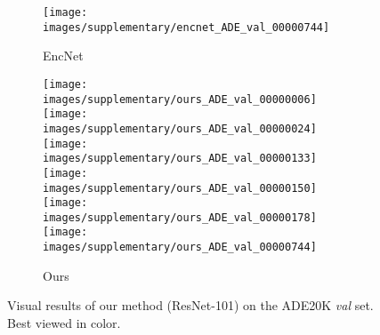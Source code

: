 \documentclass[10pt,twocolumn,letterpaper]{article}
\begin{document}
\begin{figure*}[!htb]
\begin{center}
\begin{subfigure}[b]{0.24\linewidth}
		\texttt{[image: images/supplementary/encnet\_ADE\_val\_00000744]}\\
		\caption{EncNet}
    \end{subfigure}
    \hfill
    \begin{subfigure}[b]{0.24\linewidth}
		\texttt{[image: images/supplementary/ours\_ADE\_val\_00000006]}\\
		\texttt{[image: images/supplementary/ours\_ADE\_val\_00000024]}\\
		\texttt{[image: images/supplementary/ours\_ADE\_val\_00000133]}\\
		\texttt{[image: images/supplementary/ours\_ADE\_val\_00000150]}\\
		\texttt{[image: images/supplementary/ours\_ADE\_val\_00000178]}\\
		\texttt{[image: images/supplementary/ours\_ADE\_val\_00000744]}\\
		\caption{Ours}
    \end{subfigure}
\end{center}
	\caption{Visual results of our method (ResNet-101) on the ADE20K \textit{val} set. Best viewed in color.}
\end{figure*}
\end{document}
